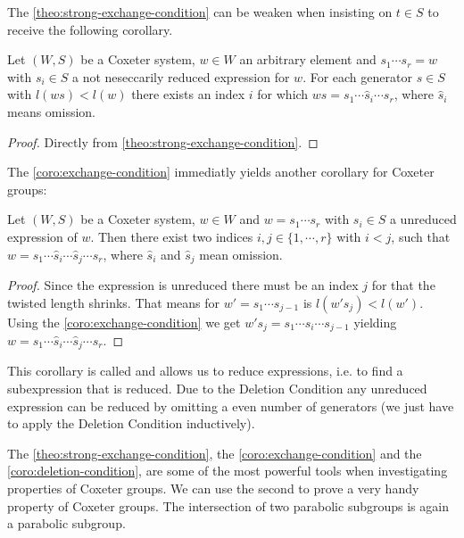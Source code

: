 The \ref{theo:strong-exchange-condition} can be weaken when insisting on $t \in S$ to receive the following corollary.

\begin{coro}
	Let $(W,S)$ be a Coxeter system, $w \in W$ an arbitrary element and ${s_1 \cdots s_r = w}$ with $s_i \in S$ a not neseccarily reduced expression for $w$. For each generator $s \in S$ with $l(ws) < l(w)$ there exists an index $i$ for which $ws = s_1 \cdots \hat s_i \cdots s_r$, where $\hat s_i$ means omission.

	\begin{proof}
		Directly from \ref{theo:strong-exchange-condition}.
	\end{proof}
\end{coro}

The \ref{coro:exchange-condition} immediatly yields another corollary for Coxeter groups:

\begin{coro}
	Let $(W,S)$ be a Coxeter system, $w \in W$ and $w = s_1 \cdots s_r$ with $s_i \in S$ a unreduced expression of $w$. Then there exist two indices $i,j \in \{1,\cdots,r\}$ with $i < j$, such that $w = s_1 \cdots \hat s_i \cdots \hat s_j \cdots s_r$, where $\hat s_i$ and $\hat s_j$ mean omission.

	\begin{proof}
		Since the expression is unreduced there must be an index $j$ for that the twisted length shrinks. That means for $w' = s_1 \cdots s_{j-1}$ is $l(w' s_j) < l(w')$. Using the \ref{coro:exchange-condition} we get $w' s_j = s_1 \cdots \hat s_i \cdots s_{j-1}$ yielding $w = s_1 \cdots \hat s_i \cdots \hat s_j \cdots s_r$.
	\end{proof}
\end{coro}

This corollary is called  and allows us to reduce expressions, i.e. to find a subexpression that is reduced. Due to the Deletion Condition any unreduced expression can be reduced by omitting a even number of generators (we just have to apply the Deletion Condition inductively).

The \ref{theo:strong-exchange-condition}, the \ref{coro:exchange-condition} and the \ref{coro:deletion-condition}, are some of the most powerful tools when investigating properties of Coxeter groups. We can use the second to prove a very handy property of Coxeter groups. The intersection of two parabolic subgroups is again a parabolic subgroup.

